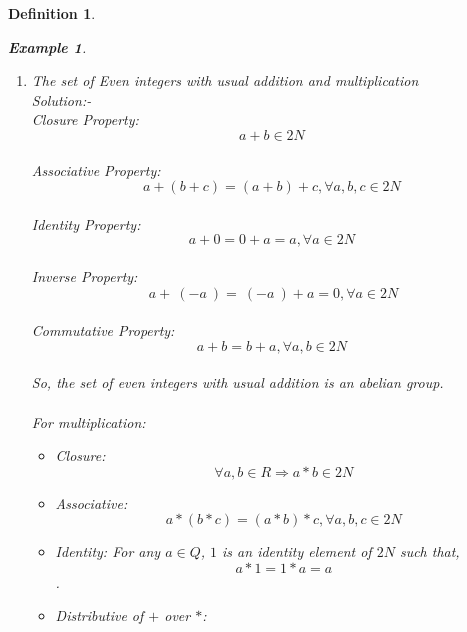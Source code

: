 \documentclass{article}
\newtheorem{defn}{Definition} [section]
\newtheorem{ex}{Example}[section]
\begin{document}
\begin{defn}
\begin{ex}
\begin{enumerate}
	\\For multiplication:
	\begin{itemize}
	    \item Closure: $$\forall a, b \in Q \Rightarrow a*b \in Q$$
        \item Associative: $$a*(b*c)=(a*b)*c, \forall a,b,c \in Q$$
	    \item Identity: For any $a \in Q$, $1$ is an identity element of $Q$ such that, $$a*1=1*a=a$$ .
		\item Distributive of $+$ over $*$:\\
	        $a*(b+c)=(a*b)+ (a*c)$  $ \forall a,b,c \in Q $ \\
	        $(a+b)*c=(a*c)+(b*c)$   $ \forall a,b,c \in Q $ \\
	   \item Commutative: $$a*b=b*a  \forall a,b \in Q$$ \\
	   \item Multiplicative Inverse: $$a*a^{-1}= a^{-1} * a = 1 , \forall a^{-1} \in Q$$\\
	    \\Therefore the set of rational numbers with usual addition and multiplication is a field.
	 \end{itemize}
	\item The set of Even integers with usual addition and multiplication
		\\ Solution:- 	\\Closure Property: $$a+b \in 2N$$
	\\Associative Property: $$a+(b+c)=(a+b)+c, \forall a,b,c \in 2N$$
	\\Identity Property: $$a+0=0+a=a, \forall a \in 2N$$
	\\Inverse Property: $$ \ a + \ (-a\ ) =\ (-a\ ) + a = 0, \forall a \in 2N$$
	\\Commutative Property: $$a+b=b+a,\forall a,b \in 2N$$
	\\So, the set of even integers with usual addition is an abelian group.\\
	\\For multiplication:
	\begin{itemize}
	    \item Closure: $$\forall a, b \in R \Rightarrow a*b \in 2N$$
        \item Associative: $$a*(b*c)=(a*b)*c, \forall a,b,c \in 2N$$
	    \item Identity: For any $a \in Q$, $1$ is an identity element of $2N$ such that, $$a*1=1*a=a$$ .
		\item Distributive of $+$ over $*$:\\

\end{itemize}
\end{enumerate}
\end{ex}
\end{defn}
\end{document}
